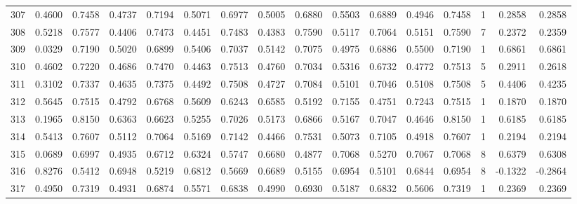 \begin{tabular}{lrrrrrrrrrrrrrrr}
307 &      0.4600 &  0.7458 &  0.4737 &  0.7194 &  0.5071 &  0.6977 &  0.5005 &  0.6880 &  0.5503 &  0.6889 &   0.4946 &     0.7458 &      1 &                    0.2858 &                     0.2858 \\
308 &      0.5218 &  0.7577 &  0.4406 &  0.7473 &  0.4451 &  0.7483 &  0.4383 &  0.7590 &  0.5117 &  0.7064 &   0.5151 &     0.7590 &      7 &                    0.2372 &                     0.2359 \\
309 &      0.0329 &  0.7190 &  0.5020 &  0.6899 &  0.5406 &  0.7037 &  0.5142 &  0.7075 &  0.4975 &  0.6886 &   0.5500 &     0.7190 &      1 &                    0.6861 &                     0.6861 \\
310 &      0.4602 &  0.7220 &  0.4686 &  0.7470 &  0.4463 &  0.7513 &  0.4760 &  0.7034 &  0.5316 &  0.6732 &   0.4772 &     0.7513 &      5 &                    0.2911 &                     0.2618 \\
311 &      0.3102 &  0.7337 &  0.4635 &  0.7375 &  0.4492 &  0.7508 &  0.4727 &  0.7084 &  0.5101 &  0.7046 &   0.5108 &     0.7508 &      5 &                    0.4406 &                     0.4235 \\
312 &      0.5645 &  0.7515 &  0.4792 &  0.6768 &  0.5609 &  0.6243 &  0.6585 &  0.5192 &  0.7155 &  0.4751 &   0.7243 &     0.7515 &      1 &                    0.1870 &                     0.1870 \\
313 &      0.1965 &  0.8150 &  0.6363 &  0.6623 &  0.5255 &  0.7026 &  0.5173 &  0.6866 &  0.5167 &  0.7047 &   0.4646 &     0.8150 &      1 &                    0.6185 &                     0.6185 \\
314 &      0.5413 &  0.7607 &  0.5112 &  0.7064 &  0.5169 &  0.7142 &  0.4466 &  0.7531 &  0.5073 &  0.7105 &   0.4918 &     0.7607 &      1 &                    0.2194 &                     0.2194 \\
315 &      0.0689 &  0.6997 &  0.4935 &  0.6712 &  0.6324 &  0.5747 &  0.6680 &  0.4877 &  0.7068 &  0.5270 &   0.7067 &     0.7068 &      8 &                    0.6379 &                     0.6308 \\
316 &      0.8276 &  0.5412 &  0.6948 &  0.5219 &  0.6812 &  0.5669 &  0.6689 &  0.5155 &  0.6954 &  0.5101 &   0.6844 &     0.6954 &      8 &                   -0.1322 &                    -0.2864 \\
317 &      0.4950 &  0.7319 &  0.4931 &  0.6874 &  0.5571 &  0.6838 &  0.4990 &  0.6930 &  0.5187 &  0.6832 &   0.5606 &     0.7319 &      1 &                    0.2369 &                     0.2369 \\

\end{tabular}
